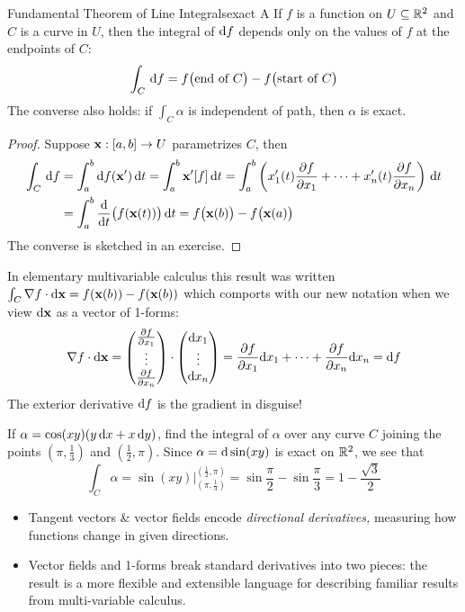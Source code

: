 \begin{thm}{Fundamental Theorem of Line Integrals}{exact}
A 
If $f$ is a function on $U\subseteq\R^2$ and $C$ is a curve in $U$, then the integral of $\df$ depends only on the values of $f$ at the endpoints of $C$:
\[\int_{C}\,\df=f\bigl(\text{end of $C$}\bigr)-f\bigl(\text{start of $C$}\bigr)\]
The converse also holds: if $\int_C\alpha$ is independent of path, then $\alpha$ is exact.
\end{thm}

\begin{proof}
Suppose $\vx:[a,b]\to U$ parametrizes $C$, then
\begin{align*}
\int_{C}\,\df&=\int_a^b\df(\vx')\,\dt=\int_a^b\vx'[f]\,\dt =\int_a^b\left(x_1'(t)\partials[f]{x_1}+\cdots+x_n'(t)\partials[f]{x_n}\right)\,\dt\\
&=\int_a^b\diff{t}\bigl(f(\vx(t))\bigr)\,\dt =f\bigl(\vx(b)\bigr)-f\bigl(\vx(a)\bigr)%
\end{align*}
The converse is sketched in an exercise.
\end{proof}

In elementary multivariable calculus this result was written $\int_C\nabla f\cdot\dvx=f(\vx(b))-f(\vx(b))$ which comports with our new notation when we view $\dvx$ as a vector of 1-forms:
\[\nabla f\cdot\dvx=\threevec{\partials[f]{x_1}}{\vdots}{\partials[f]{x_n}}\cdot\threevec{\dx_1}{\vdots}{\dx_n}=\partials[f]{x_1}\dx_1+\cdots+\partials[f]{x_n}\dx_n =\df\]
The exterior derivative $\df$ is the gradient in disguise!

\begin{example}{}{}
If $\alpha=\cos(xy)(y\,\dx+x\,\dy)$, find the integral of $\alpha$ over any curve $C$ joining the points $\left(\pi,\frac 13\right)$ and $\left(\frac 12,\pi\right)$. Since $\alpha=\D\sin(xy)$ is exact on $\R^2$, we see that
\[\int_C\alpha=\sin(xy)\Bigr|_{\left(\pi,\frac 13\right)}^{\left(\frac 12,\pi\right)}=\sin\frac \pi 2-\sin\frac \pi 3=1-\frac{\sqrt 3}2\]
\end{example}



\begin{itemize}\itemsep0pt
  \item Tangent vectors \& vector fields encode \emph{directional derivatives,} measuring how functions change in given directions.
  
  \item Vector fields and 1-forms break standard derivatives into two pieces: the result is a more flexible and extensible language for describing familiar results from multi-variable calculus.
\end{itemize}

